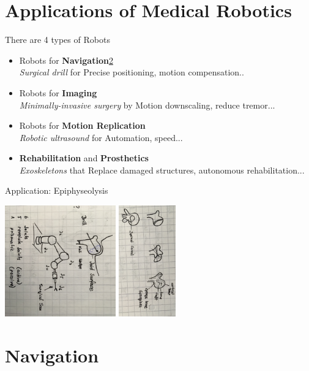\documentclass{exerciseBlue}
\begin{document}
	\section{Applications of Medical Robotics}
	 There are 4 types of Robots
	  \begin{itemize}
	  	\item Robots for \textbf{Navigation}\ref{sec:navigation}\\
	  	\textit{Surgical drill} for Precise positioning, motion compensation..
	  	\item Robots for \textbf{Imaging}\\
	  	\textit{Minimally-invasive surgery} by Motion downscaling, reduce tremor...
		\item Robots for \textbf{Motion Replication}\\
		\textit{Robotic ultrasound} for Automation, speed...
		\item \textbf{Rehabilitation} and \textbf{Prosthetics}\\
		\textit{Exoskeletons} that Replace damaged structures, autonomous rehabilitation...
	  \end{itemize}
	  Application: Epiphyseolysis
	  \begin{center}
	  	\includegraphics[height = 4.8cm]{Images/MR1}
	  	\includegraphics[height = 4.8cm]{Images/MR2}
	  \end{center}
  
  \section{Navigation}\label{sec:navigation}
\end{document}
